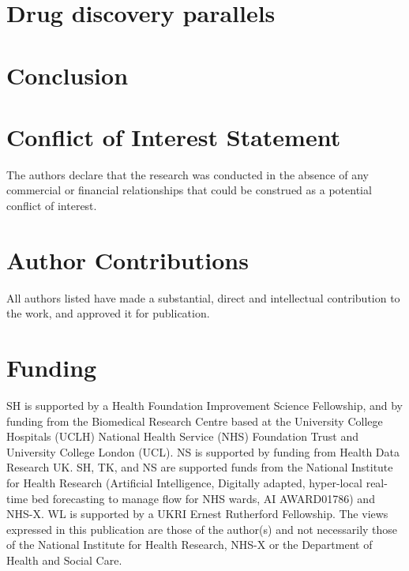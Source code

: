 \documentclass[utf8]{FrontiersinVancouver}
\begin{document}
\section*{Drug discovery parallels}

\section*{Conclusion}






\section*{Conflict of Interest Statement}

The authors declare that the research was conducted in the absence of any commercial or financial relationships that could be construed as a potential conflict of interest.

\section*{Author Contributions}
All authors listed have made a substantial, direct and intellectual contribution to the work, and approved it for publication.

\section*{Funding}

SH is supported by a Health Foundation Improvement Science Fellowship, and by funding from  the Biomedical Research Centre based at the University College Hospitals (UCLH) National Health Service (NHS) Foundation Trust and University College London (UCL). NS is supported by funding from Health Data Research UK. SH, TK, and NS are supported funds from the National Institute for Health Research (Artificial Intelligence, Digitally adapted, hyper-local real-time bed forecasting to manage flow for NHS wards, AI AWARD01786) and NHS-X.  WL is supported by a UKRI Ernest Rutherford Fellowship.
The views expressed in this publication are those of the author(s) and not necessarily those of the National Institute for Health Research, NHS-X or the Department of Health and Social Care.
\end{document}
